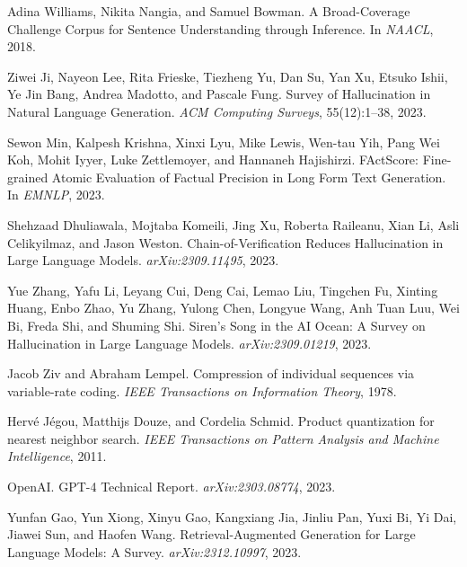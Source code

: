 \documentclass[11pt]{article}
\begin{document}
\begin{thebibliography}{20}
Adina Williams, Nikita Nangia, and Samuel Bowman.
\newblock A Broad-Coverage Challenge Corpus for Sentence Understanding through Inference.
\newblock In \emph{NAACL}, 2018.

Ziwei Ji, Nayeon Lee, Rita Frieske, Tiezheng Yu, Dan Su, Yan Xu, Etsuko Ishii, Ye Jin Bang, Andrea Madotto, and Pascale Fung.
\newblock Survey of Hallucination in Natural Language Generation.
\newblock \emph{ACM Computing Surveys}, 55(12):1--38, 2023.

Sewon Min, Kalpesh Krishna, Xinxi Lyu, Mike Lewis, Wen-tau Yih, Pang Wei Koh, Mohit Iyyer, Luke Zettlemoyer, and Hannaneh Hajishirzi.
\newblock FActScore: Fine-grained Atomic Evaluation of Factual Precision in Long Form Text Generation.
\newblock In \emph{EMNLP}, 2023.

Shehzaad Dhuliawala, Mojtaba Komeili, Jing Xu, Roberta Raileanu, Xian Li, Asli Celikyilmaz, and Jason Weston.
\newblock Chain-of-Verification Reduces Hallucination in Large Language Models.
\newblock \emph{arXiv:2309.11495}, 2023.

Yue Zhang, Yafu Li, Leyang Cui, Deng Cai, Lemao Liu, Tingchen Fu, Xinting Huang, Enbo Zhao, Yu Zhang, Yulong Chen, Longyue Wang, Anh Tuan Luu, Wei Bi, Freda Shi, and Shuming Shi.
\newblock Siren's Song in the AI Ocean: A Survey on Hallucination in Large Language Models.
\newblock \emph{arXiv:2309.01219}, 2023.

Jacob Ziv and Abraham Lempel.
\newblock Compression of individual sequences via variable-rate coding.
\newblock \emph{IEEE Transactions on Information Theory}, 1978.

Herv\'{e} J\'{e}gou, Matthijs Douze, and Cordelia Schmid.
\newblock Product quantization for nearest neighbor search.
\newblock \emph{IEEE Transactions on Pattern Analysis and Machine Intelligence}, 2011.

OpenAI.
\newblock GPT-4 Technical Report.
\newblock \emph{arXiv:2303.08774}, 2023.

Yunfan Gao, Yun Xiong, Xinyu Gao, Kangxiang Jia, Jinliu Pan, Yuxi Bi, Yi Dai, Jiawei Sun, and Haofen Wang.
\newblock Retrieval-Augmented Generation for Large Language Models: A Survey.
\newblock \emph{arXiv:2312.10997}, 2023.

\end{thebibliography}
\end{document}
